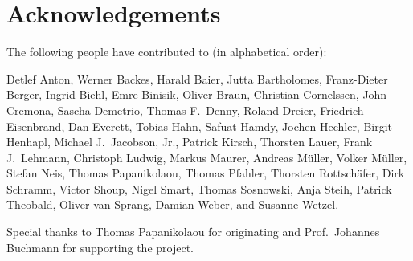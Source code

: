 \section{Acknowledgements}

The following people have contributed to \LiDIA (in alphabetical order):

Detlef Anton, Werner Backes, Harald Baier, Jutta Bartholomes, Franz-Dieter
Berger, Ingrid Biehl, Emre Binisik, Oliver Braun, Christian Cornelssen, John
Cremona, Sascha Demetrio, Thomas F.~Denny, Roland Dreier, Friedrich
Eisenbrand, Dan Everett, Tobias Hahn, Safuat Hamdy, Jochen Hechler, Birgit
Henhapl, Michael J.~Jacobson, Jr., Patrick Kirsch, Thorsten Lauer, Frank
J.~Lehmann, Christoph Ludwig, Markus Maurer, Andreas M\"uller, Volker
M\"uller, Stefan Neis, Thomas Papanikolaou, Thomas Pfahler, Thorsten
Rottsch\"afer, Dirk Schramm, Victor Shoup, Nigel Smart, Thomas Sosnowski, Anja
Steih, Patrick Theobald, Oliver van Sprang, Damian Weber, and
Susanne Wetzel. 

Special thanks to Thomas Papanikolaou for originating \LiDIA and Prof.~Johannes Buchmann for
supporting the project.
